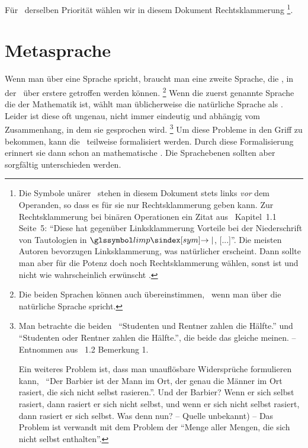 Für \Operationen\ derselben Priorität wählen wir in diesem Dokument Rechtsklammerung%
\footnote{%
	Die Symbole unärer \Operationen\ stehen in diesem Dokument stets links \emph{vor} dem Operanden, so dass es für sie nur Rechtsklammerung geben kann.
	Zur Rechtsklammerung bei binären Operationen ein Zitat aus~\cite{bib:Rautenberg} Kapitel~1.1 Seite~5:
	\enquote{Diese hat gegenüber Linksklammerung Vorteile bei der Niederschrift von Tautologien in $\symlimp$, [...]}.
	Die meisten Autoren bevorzugen Linksklammerung, was natürlicher erscheint.
	Dann sollte man aber für die Potenz doch noch Rechtsklammerung wählen, sonst ist  und nicht wie wahrscheinlich erwünscht .
}.

\section{Metasprache}%
\label{sec:Metasprache}

Wenn man über eine Sprache spricht, braucht man eine zweite Sprache, die , in der \Aussagen\ über erstere getroffen werden können.%
\footnote{%
	Die beiden Sprachen können auch übereinstimmen, \textzB\ wenn man über die natürliche Sprache spricht.
}
Wenn die zuerst genannte Sprache die der Mathematik ist, wählt man üblicherweise die natürliche Sprache als \Metasprache.
Leider ist diese oft ungenau, nicht immer eindeutig und abhängig vom Zusammenhang, in dem sie gesprochen wird.%
\footnote{%
	Man betrachte die beiden \Aussagen\ \enquote{Studenten und Rentner zahlen die Hälfte.} und \enquote{Studenten oder Rentner zahlen die Hälfte.}, die beide das gleiche meinen.
	-- Entnommen aus \cite{bib:Rautenberg} \sectionname~1.2 Bemerkung 1.

	Ein weiteres Problem ist, dass man unauflösbare Widersprüche formulieren kann, \textzB\ \enquote{Der Barbier ist der Mann im Ort, der genau die Männer im Ort rasiert, die sich nicht selbst rasieren.}.
	Und der Barbier?
	Wenn er sich selbst rasiert, dann rasiert er sich nicht selbst, und wenn er sich nicht selbst rasiert, dann rasiert er sich selbst.
	Was denn nun?
	-- Quelle unbekannt) --
	Das Problem ist verwandt mit dem Problem der \enquote{Menge aller Mengen, die sich nicht selbst enthalten}.
}
Um diese Probleme in den Griff zu bekommen, kann die \Metasprache\ teilweise formalisiert werden.
Durch diese Formalisierung erinnert sie dann schon an mathematische \Formeln.
Die Sprachebenen sollten aber sorgfältig unterschieden werden.

